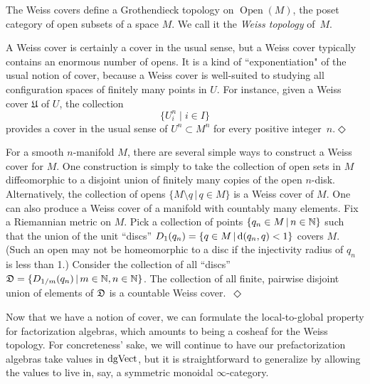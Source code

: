 \documentclass[11pt]{amsart}
\def\mcol{\, | \,}
\def\Open{\operatorname{Open}}
\begin{document}
The Weiss covers define a Grothendieck topology on $\Open(M)$, the poset category of open subsets of a space $M$. We call it the {\em Weiss topology} of~$M$. 

\begin{rmk}
A Weiss cover is certainly a cover in the usual sense, but a Weiss cover typically contains an enormous number of opens. It is a kind of ``exponentiation" of the usual notion of cover, because a Weiss cover is well-suited to studying all configuration spaces of finitely many points in $U$. For instance, given a Weiss cover $\mathfrak{U}$ of $U$, the collection 
\[
\{ U_i^n \mid i \in I\}
\]
provides a cover in the usual sense of $U^n \subset M^n$ for every positive integer~$n$.\hfill$\Diamond$ 
\end{rmk}

\begin{eg}\label{WeissAsExponential}
For a smooth $n$-manifold $M$, there are several simple ways to construct a Weiss cover for $M$. One construction is simply to take the collection of open sets in $M$ diffeomorphic to a disjoint union of finitely many copies of the open $n$-disk. Alternatively, the collection of opens $\{ M \setminus q \mcol q \in M\}$ is a Weiss cover of $M$. One can also produce a Weiss cover of a manifold with countably many elements. Fix a Riemannian metric on $M$. Pick a collection of points $\{q_n\in M \mcol n \in \NN\}$ such that the union of the unit ``discs'' $D_1(q_n) = \{ q \in M \mcol \d(q_n,q) < 1\}$ covers $M$. (Such an open may not be homeomorphic to a disc if the injectivity radius of $q_n$ is less than 1.)  Consider the collection of all ``discs'' $\fD = \{ D_{1/m}(q_n) \mcol m \in \NN, n \in \NN\}$.  The collection of all finite, pairwise disjoint union of elements of $\mathfrak D$ is a countable Weiss cover.~\hfill $\Diamond$ 
\end{eg}

Now that we have a notion of cover, we can formulate the local-to-global property for factorization algebras,
which amounts to being a cosheaf for the Weiss topology.
For concreteness' sake, we will continue to have our prefactorization algebras take values in ${\rm dgVect}$,
but it is straightforward to generalize by allowing the values to live in, say, a symmetric monoidal $\infty$-category.
\end{document}
